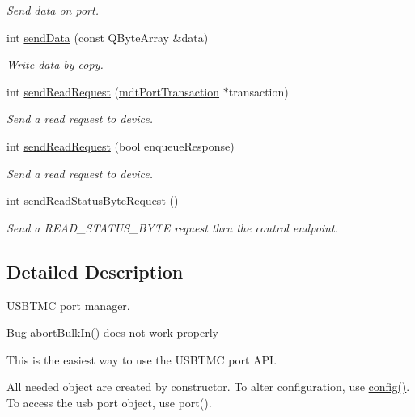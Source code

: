 \begin{DoxyCompactItemize}
\begin{DoxyCompactList}\small\item\em Send data on port. \end{DoxyCompactList}\item 
int \hyperlink{classmdt_usbtmc_port_manager_a6d566c68ddeb7c7ca14b5c70ae784efc}{sendData} (const QByteArray \&data)
\begin{DoxyCompactList}\small\item\em Write data by copy. \end{DoxyCompactList}\item 
int \hyperlink{classmdt_usbtmc_port_manager_a2920bdd6b189f198f132de9e5555a78b}{sendReadRequest} (\hyperlink{classmdt_port_transaction}{mdtPortTransaction} $\ast$transaction)
\begin{DoxyCompactList}\small\item\em Send a read request to device. \end{DoxyCompactList}\item 
int \hyperlink{classmdt_usbtmc_port_manager_ab1604a1c8f2e9192714d039dbf9a5158}{sendReadRequest} (bool enqueueResponse)
\begin{DoxyCompactList}\small\item\em Send a read request to device. \end{DoxyCompactList}\item 
int \hyperlink{classmdt_usbtmc_port_manager_a7bcc280bd4a26ed523832550b1e61553}{sendReadStatusByteRequest} ()
\begin{DoxyCompactList}\small\item\em Send a READ\_\-STATUS\_\-BYTE request thru the control endpoint. \end{DoxyCompactList}\end{DoxyCompactItemize}


\subsection{Detailed Description}
USBTMC port manager. 

\begin{Desc}
\item[\hyperlink{bug__bug000002}{Bug}]abortBulkIn() does not work properly \end{Desc}


This is the easiest way to use the USBTMC port API.

All needed object are created by constructor. To alter configuration, use \hyperlink{classmdt_port_manager_a9cf3ea2da38f81682695b37448712ffd}{config()}. To access the usb port object, use port().

